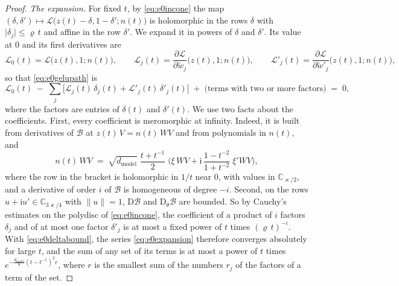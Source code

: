 \documentclass[10pt]{article}
\theoremstyle{definition}
\theoremstyle{remark}
\newcommand{\dm}{d_{\mathrm{model}}}
\newcommand{\Der}{\mathrm{D}}
\newcommand{\norm}[1]{\lVert #1\rVert}
\begin{document}
\begin{proof}
\emph{The expansion.} For fixed $t$, by \eqref{eq:e0incone} the map $(\delta, \delta') \mapsto \mathcal L\big(z(t) - \delta, 1 - \delta'; n(t)\big)$ is holomorphic in the rows $\delta$ with $\lvert\delta_j\rvert \le \varrho\,t$ and affine in the row $\delta'$. We expand it in powers of $\delta$ and $\delta'$. Its value at $0$ and its first derivatives are
\[
\mathcal L_0(t) = \mathcal L\big(z(t), 1; n(t)\big), \qquad \mathcal L_j(t) = \frac{\partial\mathcal L}{\partial\tilde w_j}\big(z(t), 1; n(t)\big), \qquad \mathcal L'_j(t) = \frac{\partial\mathcal L}{\partial\tilde w'_j}\big(z(t), 1; n(t)\big),
\]
so that \eqref{eq:e0gelupath} is
\begin{equation}\label{eq:e0expansion}
\mathcal L_0(t) \;-\; \sum_j\Big[\mathcal L_j(t)\,\delta_j(t) + \mathcal L'_j(t)\,\delta'_j(t)\Big] \;+\; \big(\text{terms with two or more factors}\big) \;=\; 0 ,
\end{equation}
where the factors are entries of $\delta(t)$ and $\delta'(t)$. We use two facts about the coefficients. First, every coefficient is meromorphic at infinity. Indeed, it is built from derivatives of $\mathcal B$ at $z(t)\,V = n(t)\,WV$ and from polynomials in $n(t)$, and
\[
n(t)\,WV \;=\; \sqrt{\dm}\;\frac{t + t^{-1}}{2}\;\Big(\xi\,WV + \mathrm i\,\frac{1 - t^{-2}}{1 + t^{-2}}\;\xi'WV\Big),
\]
where the row in the bracket is holomorphic in $1/t$ near $0$, with values in $\mathbb C_{\varkappa/2}$, and a derivative of order $i$ of $\mathcal B$ is homogeneous of degree $-i$. Second, on the rows $u + \mathrm iu' \in \mathbb C_{3\varkappa/4}$ with $\norm{u} = 1$, $\Der\mathcal B$ and $\Der_\theta\mathcal B$ are bounded. So by Cauchy's estimates on the polydisc of \eqref{eq:e0incone}, the coefficient of a product of $i$ factors $\delta_j$ and of at most one factor $\delta'_j$ is at most a fixed power of $t$ times $(\varrho\,t)^{-i}$. With \eqref{eq:e0deltabound}, the series \eqref{eq:e0expansion} therefore converges absolutely for large $t$, and the sum of any set of its terms is at most a power of $t$ times $e^{-\frac{\dm}{8}(t - t^{-1})^2r}$, where $r$ is the smallest sum of the numbers $r_j$ of the factors of a term of the set.


\end{proof}
\end{document}
